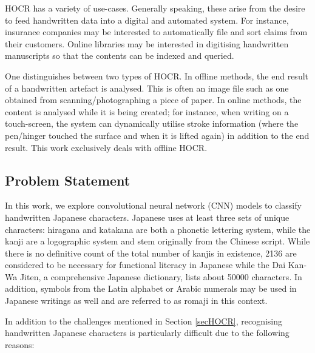\documentclass[british,12p]{article}
\begin{document}
    HOCR has a variety of use-cases. Generally speaking, these arise from the desire to feed handwritten data into a digital and automated system. For instance, insurance companies may be interested to automatically file and sort claims from their customers. Online libraries may be interested in digitising handwritten manuscripts so that the contents can be indexed and queried. 
    
    One distinguishes between two types of HOCR\cite{perwei:2014}. In offline methods, the end result of a handwritten artefact is analysed. This is often an image file such as one obtained from scanning/photographing a piece of paper. In online methods, the content is analysed while it is being created; for instance, when writing on a touch-screen, the system can dynamically utilise stroke information (where the pen/hinger touched the surface and when it is lifted again) in addition to the end result. This work exclusively deals with offline HOCR. 
    
    \subsection{Problem Statement}
    In this work, we explore convolutional neural network (CNN) models to classify handwritten Japanese characters. Japanese uses at least three sets of unique characters: hiragana and katakana are both a phonetic lettering system, while the kanji are a logographic system and stem originally from the Chinese script. While there is no definitive count of the total number of kanjis in existence, 2136 are considered to be necessary for functional literacy in Japanese while the  Dai Kan-Wa Jiten, a comprehensive Japanese dictionary, lists about 50000 characters\cite{morohashi:90}. In addition, symbols from the Latin alphabet or Arabic numerals may be used in Japanese writings as well and are referred to as romaji in this context. 
    
    In addition to the challenges mentioned in Section \ref{secHOCR}, recognising handwritten Japanese characters is particularly difficult due to the following reasons:
    
\end{document}
